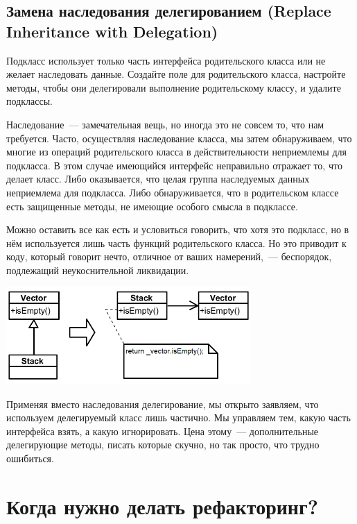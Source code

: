 \documentclass{../../text-style}
\begin{document}
\subsection{Замена наследования делегированием (Replace Inheritance with Delegation)}

Подкласс использует только часть интерфейса родительского класса или не желает наследовать данные. Создайте поле для родительского класса, настройте методы, чтобы они делегировали выполнение родительскому классу, и удалите подклассы.

Наследование~--- замечательная вещь, но иногда это не совсем то, что нам требуется. Часто, осуществляя наследование класса, мы затем обнаруживаем, что многие из операций родительского класса в действительности неприемлемы для подкласса. В этом случае имеющийся интерфейс неправильно отражает то, что делает класс. Либо оказывается, что целая группа наследуемых данных неприемлема для подкласса. Либо обнаруживается, что в родительском классе есть защищенные методы, не имеющие особого смысла в подклассе.

Можно оставить все как есть и условиться говорить, что хотя это подкласс, но в нём используется лишь часть функций родительского класса. Но это приводит к коду, который говорит нечто, отличное от ваших намерений,~--- беспорядок, подлежащий неукоснительной ликвидации.

\begin{center}
    \includegraphics[width=0.7\textwidth]{replaceInheritanceWithDelegation.png}
\end{center}

Применяя вместо наследования делегирование, мы открыто заявляем, что используем делегируемый класс лишь частично. Мы управляем тем, какую часть интерфейса взять, а какую игнорировать. Цена этому~--- дополнительные делегирующие методы, писать которые скучно, но так просто, что трудно ошибиться.

\section{Когда нужно делать рефакторинг?}
\end{document}
